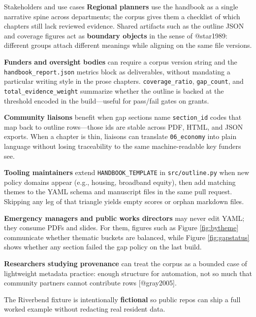 \documentclass[
  ignorenonframetext,
]{beamer}
\author{\texorpdfstring{}{}}
\date{}
\begin{document}
\begin{frame}[fragile]{Stakeholders and use cases}
\protect{}\label{stakeholders-and-use-cases}
\textbf{Regional planners} use the handbook as a single narrative spine
across departments; the corpus gives them a checklist of which chapters
still lack reviewed evidence. Shared artifacts such as the outline JSON
and coverage figures act as \textbf{boundary objects} in the sense of
@star1989: different groups attach different meanings while aligning on
the same file versions.

\textbf{Funders and oversight bodies} can require a corpus version
string and the \texttt{handbook\_report.json} metrics block as
deliverables, without mandating a particular writing style in the prose
chapters. \texttt{coverage\_ratio}, \texttt{gap\_count}, and
\texttt{total\_evidence\_weight} summarize whether the outline is backed
at the threshold encoded in the build---useful for pass/fail gates on
grants.

\textbf{Community liaisons} benefit when gap sections name
\texttt{section\_id} codes that map back to outline rows---those ids are
stable across PDF, HTML, and JSON exports. When a chapter is thin,
liaisons can translate \texttt{06\_economy} into plain language without
losing traceability to the same machine-readable key funders see.

\textbf{Tooling maintainers} extend \texttt{HANDBOOK\_TEMPLATE} in
\texttt{src/outline.py} when new policy domains appear (e.g., housing,
broadband equity), then add matching themes to the YAML schema and
manuscript files in the same pull request. Skipping any leg of that
triangle yields empty scores or orphan markdown files.

\textbf{Emergency managers and public works directors} may never edit
YAML; they consume PDFs and slides. For them, figures such as Figure
\ref{fig:bytheme} communicate whether thematic buckets are balanced,
while Figure \ref{fig:gapstatus} shows whether any section failed the
gap policy on the last build.

\textbf{Researchers studying provenance} can treat the corpus as a
bounded case of lightweight metadata practice: enough structure for
automation, not so much that community partners cannot contribute rows
{[}@gray2005{]}.

The Riverbend fixture is intentionally \textbf{fictional} so public
repos can ship a full worked example without redacting real resident
data.
\end{frame}
\end{document}
